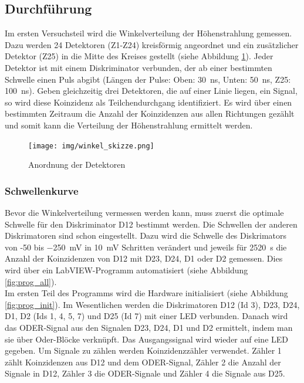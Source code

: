 \subsection{Durchführung}

Im ersten Versuchsteil wird die Winkelverteilung der Höhenstrahlung gemessen. Dazu werden 24 Detektoren (Z1-Z24) kreisförmig angeordnet und ein zusätzlicher Detektor (Z25) in die Mitte des Kreises gestellt (siehe Abbildung \ref{fig:winkel_skizze}). Jeder Detektor ist mit einem Diskriminator verbunden, der ab einer bestimmten Schwelle einen Puls abgibt (Längen der Pulse: Oben: \SI{30}{\nano\second}, Unten: \SI{50}{\nano\second}, Z25: \SI{100}{\nano\second}).
Geben gleichzeitig drei Detektoren, die auf einer Linie liegen, ein Signal, so wird diese Koinzidenz als Teilchendurchgang identifiziert. Es wird  über einen bestimmten Zeitraum die Anzahl der Koinzidenzen aus allen Richtungen gezählt und somit kann die Verteilung der Höhenstrahlung ermittelt werden.

\begin{figure}[h]
\centering
\texttt{[image: img/winkel\_skizze.png]}
\caption{Anordnung der Detektoren\cite{praktikumsheft}}
\label{fig:winkel_skizze}
\end{figure}

\subsubsection{Schwellenkurve}
Bevor die Winkelverteilung vermessen werden kann, muss zuerst die optimale Schwelle für den Diskriminator D12 bestimmt werden. Die Schwellen der anderen Diskrimatoren sind schon eingestellt. Dazu wird die Schwelle des Diskrimators von -50 bis  \SI{-250}{\milli\volt} in \SI{10}{\milli\volt} Schritten verändert und jeweils für \SI{2520}{\second} die Anzahl der Koinzidenzen von D12 mit D23, D24, D1 oder D2 gemessen. Dies wird über ein LabVIEW-Programm automatisiert (siehe Abbildung \ref{fig:prog_all}).\\

Im ersten Teil des Programms wird die Hardware initialisiert (siehe Abbildung \ref{fig:prog_init}). Im Wesentlichen werden die Diskrimatoren D12 (Id 3), D23, D24, D1, D2 (Ids 1, 4, 5, 7) und D25 (Id 7) mit einer LED verbunden. Danach wird das ODER-Signal aus den Signalen D23, D24, D1 und D2 ermittelt, indem man sie über Oder-Blöcke verknüpft. Das Ausgangssignal wird wieder auf eine LED gegeben. Um Signale zu zählen werden Koinzidenzzähler verwendet. Zähler 1 zählt Koinzidenzen aus D12 und dem ODER-Signal, Zähler 2 die Anzahl der Signale in D12, Zähler 3 die ODER-Signale und Zähler 4 die Signale aus D25. \\

